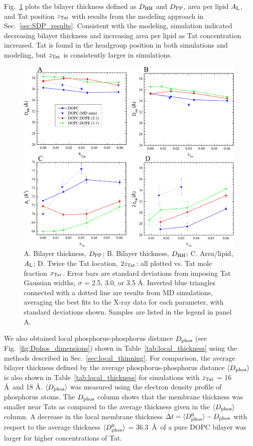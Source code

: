 Fig.~\ref{fig:DHH_DPP_AL_zTat} plots the bilayer thickness defined as $D_\textrm{HH}$
and $D_\textrm{PP}$, area per lipid $A_\textrm{L}$, and Tat position $z_\textrm{Tat}$ with results
from the modeling approach in Sec.~\ref{sec:SDP_results}.
Consistent with the modeling, simulation indicated decreasing bilayer thickness
and increasing area per lipid as Tat concentration increased.
Tat is found in the headgroup position in both simulations 
and modeling, but $z_\textrm{Tat}$ is consistently larger in simulations.

\begin{figure}[htbp]
  \centering
  \includegraphics[width=\textwidth]{figures/Tat/MD_Results/DHH_DPP_AL_zTat}
  \caption{A. Bilayer thickness, $D_\textrm{PP}$; B. Bilayer thickness, $D_\textrm{HH}$; 
  C. Area/lipid, $A_\textrm{L}$; D. Twice the Tat location, $2z_\textrm{Tat}$: all plotted vs. 
  Tat mole fraction $x_\textrm{Tat}$.  Error bars are standard deviations from imposing 
  Tat Gaussian widths, $\sigma$ = 2.5, 3.0, or 3.5 \AA.   
  Inverted blue triangles connected with a dotted line are results from MD simulations, 
  averaging the best fits to the X-ray data for each parameter, with standard 
  deviations shown. Samples are listed in the legend in panel A.}
  \label{fig:DHH_DPP_AL_zTat}
\end{figure}

\newpage
We also obtained local phosphorus-phosphorus distance $D_\text{phos}$
(see Fig.~\ref{fig:Dphos_dimensions})
shown in Table~\ref{tab:local_thickness} 
using the methods described in Sec.~\ref{sec:local_thinning}.
For comparison, 
the average bilayer thickness defined by the average phosphorus-phosphorus 
distance $\langle D_\text{phos}\rangle$ is also shown in Table~\ref{tab:local_thickness} 
for simulations with $z_\textrm{Tat}$ = 16 \AA\ and 18 \AA. 
$\langle D_\text{phos}\rangle$ was measured using
the electron density profile of phosphorus atoms. 
The $D_\text{phos}$ column shows that the membrane thickness
was smaller near Tats as compared to the average thickness given in the
$\langle D_\text{phos}\rangle$ column.
A decrease in the local membrane thickness 
$\Delta t = \langle D_\text{phos}^0\rangle - D_\text{phos}$
with respect to the average thickness $\langle D_\text{phos}^0\rangle$ = 36.3~\AA\ 
of a pure DOPC bilayer
was larger for higher concentrations of Tat.

